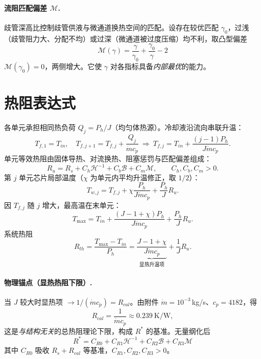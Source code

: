 \documentclass[UTF8,a4paper,12pt]{ctexart}
\numberwithin{equation}{section}
\begin{document}
\paragraph{流阻匹配偏差 $\mathcal M$.}歧管深高比控制歧管供液与微通道换热空间的匹配。设存在较优匹配 $\gamma_0$，过浅（歧管阻力大、分配不均）或过深（微通道被过度压缩）均不利，取凸型偏差
\begin{equation}
    \boxed{\;
    \mathcal M(\gamma)=\frac{\gamma}{\gamma_0}+\frac{\gamma_0}{\gamma}-2
    \;}
    \label{eq:M}
\end{equation}
$\mathcal M(\gamma_0)=0$，两侧增大。它使 $\gamma$ 对各指标具备\emph{内部最优}的能力。

\section{热阻表达式}

各单元承担相同热负荷 $Q_j=P_h/J$（均匀体热源）。冷却液沿流向串联升温：
\begin{equation}
    T_{f,1}=T_{in},\quad T_{f,j+1}=T_{f,j}+\frac{Q_j}{\dot m c_p}
    \ \Rightarrow\
    T_{f,j}=T_{in}+\frac{(j-1)P_h}{J\dot m c_p}.
    \label{eq:Tf}
\end{equation}
单元等效热阻由固体导热、对流换热、阻塞惩罚与匹配偏差组成：
\begin{equation}
    R_u=R_s+C_h\mathcal H^{-1}+C_b\mathcal B+C_m\mathcal M,\qquad C_h,C_b,C_m>0 .
    \label{eq:Ru}
\end{equation}
第 $j$ 单元芯片局部温度（$\chi$ 为单元内平均升温修正，取 $1/2$）：
\begin{equation}
    T_{w,j}=T_{f,j}+\chi\frac{P_h}{J\dot m c_p}+\frac{P_h}{J}R_u .
    \label{eq:Tw}
\end{equation}
因 $T_{f,j}$ 随 $j$ 增大，最高温在末单元：
\begin{equation}
    T_{\max}=T_{in}+\frac{(J-1+\chi)P_h}{J\dot m c_p}+\frac{P_h}{J}R_u .
\end{equation}
系统热阻
\begin{equation}
    R_{th}=\frac{T_{\max}-T_{in}}{P_h}
    =\underbrace{\frac{J-1+\chi}{J\dot m c_p}}_{\text{显热升温项}}+\frac{1}{J}R_u .
    \label{eq:Rth}
\end{equation}

\paragraph{物理锚点（显热热阻下限）.}当 $J$ 较大时显热项 $\to 1/(\dot m c_p)=R_{cal}$。由附件 $\dot m=10^{-3}\,$kg/s、$c_p=4182$，得
\begin{equation}
    R_{cal}=\frac{1}{\dot m c_p}\approx 0.239~\mathrm{K/W},
\end{equation}
这是\emph{与结构无关}的总热阻理论下限，构成 $R^*$ 的基准。无量纲化后
\begin{equation}
    \boxed{\;
    R^*=C_{R0}+C_{R1}\mathcal H^{-1}+C_{R2}\mathcal B+C_{R3}\mathcal M
    \;}
    \label{eq:Rstar}
\end{equation}
其中 $C_{R0}$ 吸收 $R_s+R_{cal}$ 等基准，$C_{R1},C_{R2},C_{R3}>0$。
\end{document}
